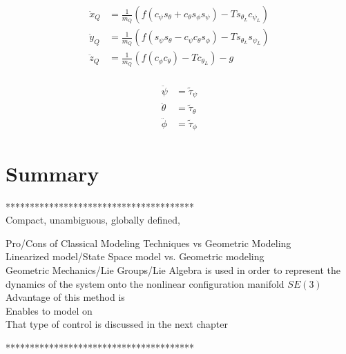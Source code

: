 \begin{equation}\label{key}
\begin{aligned}
\ddot{x}_Q&=\frac{1}{m_Q}(f(c_{\psi}s_{\theta}+c_{\theta}s_{\phi}s_{\psi})-Ts_{\theta_L}c_{\psi_L})\\
\ddot{y}_Q&=\frac{1}{m_Q}(f(s_{\psi}s_{\theta}-c_{\psi}c_{\theta}s_{\phi})-Ts_{\theta_L}s_{\psi_L})\\
\ddot{z}_Q&=\frac{1}{m_Q}(f(c_{\phi}c_{\theta})-Tc_{\theta_L})-g\\
\end{aligned}
\end{equation}



\begin{align}\label{key}
	\ddot{\psi}&=\tilde{\tau}_{\psi}\\
\ddot{\theta}&=\tilde{\tau}_{\theta}\\
\ddot{\phi} &=\tilde{\tau}_{\phi}
\end{align}

\section{Summary}

***************************************\\
Compact, unambiguous, globally defined, 

Pro/Cons of Classical Modeling Techniques vs Geometric Modeling\\

Linearized model/State Space model vs. Geometric modeling\\


Geometric Mechanics/Lie Groups/Lie Algebra is used in order to represent the dynamics of the system onto the nonlinear configuration manifold $ SE(3) $\\
Advantage of this method is\\
Enables to model on \\
That type of control is discussed in the next chapter


***************************************\\
